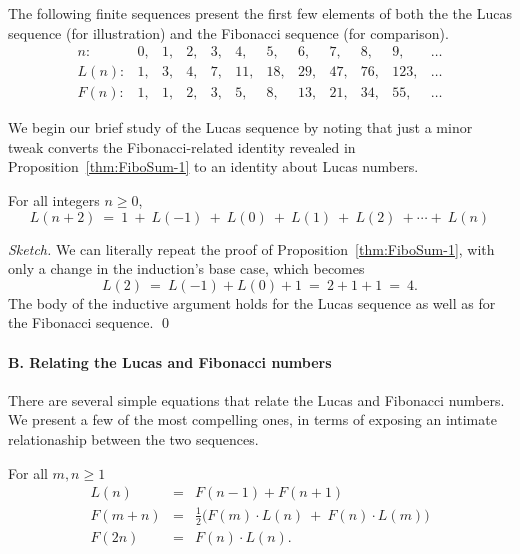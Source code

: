 \medskip

The following finite sequences present the first few elements of both
the the Lucas sequence (for illustration) and the Fibonacci sequence
(for comparison).
\[
\begin{array}{r|rrrrrrrrrrr}
n: &
 0, & 1, & 2, & 3, &  4, &  5, &  6, &  7, &  8, &   9, & \ldots \\
\hline
L(n): &
 1, & 3, & 4, & 7, & 11, & 18, & 29, & 47, & 76, & 123, & \ldots \\
F(n): &
 1, & 1, & 2, & 3, &  5, &  8, & 13, & 21, & 34, &  55, & \ldots
\end{array}
\]

We begin our  brief study of the Lucas sequence by noting that just a
minor tweak converts the Fibonacci-related identity revealed in
Proposition~\ref{thm:FiboSum-1} to an identity about Lucas numbers.

\begin{prop}
\label{thm:LucasSum-1}
For all integers $n \geq 0$,
\begin{equation}
\label{eq:multilinear-Lucas-1}
L(n+2) \ = \
1 \ + \ L(-1) \ + \ L(0) \ + \ L(1) \ + \ L(2) \ + \cdots + \ L(n)
\end{equation}
\end{prop}

\begin{proof}[Sketch]
We can literally repeat the proof of Proposition~\ref{thm:FiboSum-1},
with only a change in the induction's base case, which becomes
\[ L(2) \ = \ L(-1) + L(0) + 1 \ = \ 2 + 1 + 1 \ = \ 4. \]
The body of the inductive argument holds for the Lucas sequence as
well as for the Fibonacci sequence.
\qed
\end{proof}

\paragraph{\small\sf B. Relating the Lucas and Fibonacci numbers}

There are several simple equations that relate the Lucas and Fibonacci
numbers.  We present a few of the most compelling ones, in terms of
exposing an intimate relationaship between the two sequences.

\begin{prop}
\label{thm:Lucas-n:2Fibs}
For all $m, n \geq 1$
\begin{eqnarray}
\label{eq:L-FF}
L(n) & = & F(n-1) + F(n+1) \\
\label{eq:F-FL+FL}
F(m + n) & = & \frac{1}{2} \big( F(m) \cdot L(n) \ + \ F(n) \cdot L(m) \big) \\
\label{eq:F2n-FL}
F(2n) & = & F(n) \cdot L(n).
\end{eqnarray}
\end{prop}


